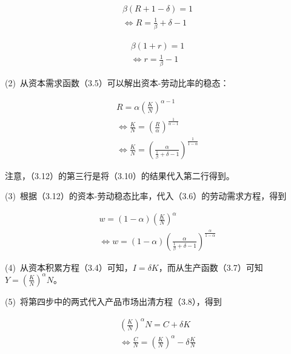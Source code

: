 \documentclass[cn,10pt,math=newtx,citestyle=gb7714-2015,bibstyle=gb7714-2015]{elegantbook}
\begin{document}
	\begin{equation}\label{label}
		\begin{split}
			\beta(R+1-\delta)=1\\
			\Leftrightarrow R=\frac{1}{\beta}+\delta-1
		\end{split}
	\end{equation}
	
	\begin{equation}\label{label}
		\begin{split}
			\beta(1+r)=1\\
			\Leftrightarrow r=\frac{1}{\beta}-1
		\end{split}
	\end{equation}
	
	(2)~从资本需求函数（3.5）可以解出资本-劳动比率的稳态：
	
	\begin{equation}\label{label}
		\begin{split}
			R=\alpha(\frac{K}{N})^{\alpha-1}\\
			\Leftrightarrow \frac{K}{N}=(\frac{R}{\alpha})^{\frac{1}{\alpha-1}}\\
			\Leftrightarrow \frac{K}{N}=(\frac{\alpha}{\frac{1}{\beta}+\delta-1})^{\frac{1}{1-\alpha}}
		\end{split}
	\end{equation}
	
	注意，（3.12）的第三行是将（3.10）的结果代入第二行得到。
	
	(3)~根据（3.12）的资本-劳动稳态比率，代入（3.6）的劳动需求方程，得到
	
	\begin{equation}\label{label}
		\begin{split}
			w=(1-\alpha)(\frac{K}{N})^{\alpha}\\
			\Leftrightarrow w=(1-\alpha)(\frac{\alpha}{\frac{1}{\beta}+\delta-1})^{\frac{\alpha}{1-\alpha}}
		\end{split}
	\end{equation}
	
	(4)~从资本积累方程（3.4）可知，$I=\delta K$，而从生产函数（3.7）可知$Y=(\frac{K}{N})^{\alpha}N$。
	
	(5)~将第四步中的两式代入产品市场出清方程（3.8），得到
	
	\begin{equation}\label{label}
		\begin{split}
			(\frac{K}{N})^{\alpha}N=C+\delta K\\
			\Leftrightarrow \frac{C}{N}=(\frac{K}{N})^{\alpha}-\delta \frac{K}{N}
		\end{split}
	\end{equation}
	
\end{document}
